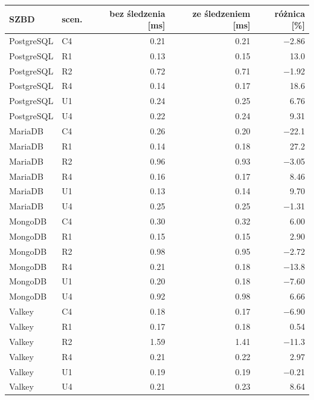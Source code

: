\begin{tabular}{llrrr}
\toprule
SZBD & scen. & bez śledzenia [ms] & ze śledzeniem [ms] & różnica [\%] \\
\midrule
PostgreSQL & C4 & \num{0.21} & \num{0.21} & \num{-2.86} \\
PostgreSQL & R1 & \num{0.13} & \num{0.15} & \num{13.0} \\
PostgreSQL & R2 & \num{0.72} & \num{0.71} & \num{-1.92} \\
PostgreSQL & R4 & \num{0.14} & \num{0.17} & \num{18.6} \\
PostgreSQL & U1 & \num{0.24} & \num{0.25} & \num{6.76} \\
PostgreSQL & U4 & \num{0.22} & \num{0.24} & \num{9.31} \\
MariaDB & C4 & \num{0.26} & \num{0.20} & \num{-22.1} \\
MariaDB & R1 & \num{0.14} & \num{0.18} & \num{27.2} \\
MariaDB & R2 & \num{0.96} & \num{0.93} & \num{-3.05} \\
MariaDB & R4 & \num{0.16} & \num{0.17} & \num{8.46} \\
MariaDB & U1 & \num{0.13} & \num{0.14} & \num{9.70} \\
MariaDB & U4 & \num{0.25} & \num{0.25} & \num{-1.31} \\
MongoDB & C4 & \num{0.30} & \num{0.32} & \num{6.00} \\
MongoDB & R1 & \num{0.15} & \num{0.15} & \num{2.90} \\
MongoDB & R2 & \num{0.98} & \num{0.95} & \num{-2.72} \\
MongoDB & R4 & \num{0.21} & \num{0.18} & \num{-13.8} \\
MongoDB & U1 & \num{0.20} & \num{0.18} & \num{-7.60} \\
MongoDB & U4 & \num{0.92} & \num{0.98} & \num{6.66} \\
Valkey & C4 & \num{0.18} & \num{0.17} & \num{-6.90} \\
Valkey & R1 & \num{0.17} & \num{0.18} & \num{0.54} \\
Valkey & R2 & \num{1.59} & \num{1.41} & \num{-11.3} \\
Valkey & R4 & \num{0.21} & \num{0.22} & \num{2.97} \\
Valkey & U1 & \num{0.19} & \num{0.19} & \num{-0.21} \\
Valkey & U4 & \num{0.21} & \num{0.23} & \num{8.64} \\
\bottomrule
\end{tabular}
